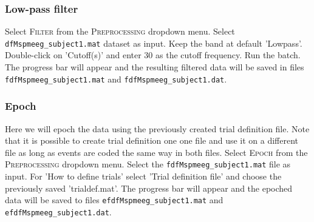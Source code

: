 \subsubsection{Low-pass filter}
 Select \textsc{Filter} from the \textsc{Preprocessing} dropdown menu. Select \texttt{dfMspmeeg\_subject1.mat} dataset as input.  Keep the band at default  'Lowpass'. Double-click on 'Cutoff(s)' and enter 30 as the cutoff frequency. Run the batch. The progress bar will appear and the resulting filtered data will be saved in files \texttt{fdfMspmeeg\_subject1.mat} and \texttt{fdfMspmeeg\_subject1.dat}. 

\subsubsection{Epoch}
Here we will epoch the data using the previously created trial definition file. Note that it is possible to create trial definition one one file and use it on a different file as long as events are coded the same way in both files.  Select \textsc{Epoch} from the \textsc{Preprocessing} dropdown menu. Select the \texttt{fdfMspmeeg\_subject1.mat} file as input. For 'How to define trials' select 'Trial definition file' and choose the previously saved 'trialdef.mat'. The progress bar will appear and the epoched data will be saved to files \texttt{efdfMspmeeg\_subject1.mat} and \texttt{efdfMspmeeg\_subject1.dat}. 

